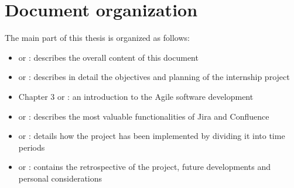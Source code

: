 \section{Document organization}
	The main part of this thesis is organized as follows:
	\begin{itemize}
		\item {} or : describes the overall content of this document
		\item {} or : describes in detail the objectives and planning of the internship project
		\item {} Chapter 3 or : an introduction to the Agile software development
		\item {} or : describes the most valuable functionalities of Jira and Confluence
		\item {} or : details how the project has been implemented by dividing it into time periods
		\item {} or : contains the retrospective of the project, future developments and personal considerations
	\end{itemize}
	
